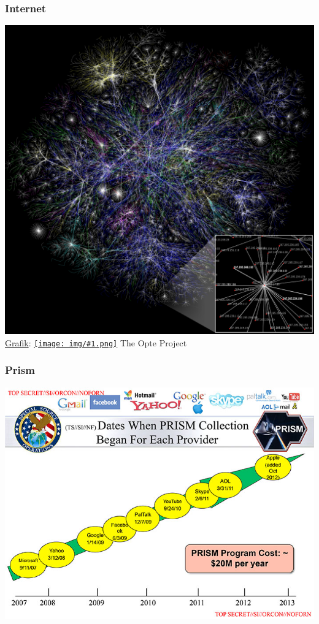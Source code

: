 \documentclass[12pt]{beamer}
\newcommand{\cc}[1]{\texttt{[image: img/\#1.png]}\hspace{1mm}}
\begin{document}
\begin{frame}
    \frametitle{Internet}
    \pause
    \begin{center}
      \includegraphics[height=0.7\textheight]{img/Internet_map_1024.jpg}
      {\\ \tiny \href{http://commons.wikimedia.org/wiki/File:Internet_map_1024.jpg}{Grafik}: \href{http://creativecommons.org/licenses/by/2.5/deed.en}{\cc{by}} The Opte Project}
    \end{center}
\end{frame}

\begin{frame}
    \frametitle{Prism}
    \pause
    \begin{center}
      \includegraphics[height=0.7\textheight]{img/prism.jpg}
    \end{center}
\end{frame}
\end{document}
